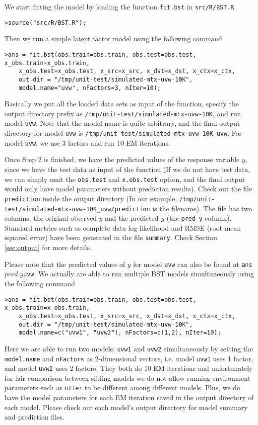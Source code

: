 We start fitting the model by loading the function {\tt fit.bst} in {\tt src/R/BST.R}. 
{\small\begin{verbatim}
>source("src/R/BST.R");
\end{verbatim}}
Then we run a simple latent factor model using the following command
{\small\begin{verbatim}
>ans = fit.bst(obs.train=obs.train, obs.test=obs.test, x_obs.train=x_obs.train, 
	x_obs.test=x_obs.test, x_src=x_src, x_dst=x_dst, x_ctx=x_ctx,
	out.dir = "/tmp/unit-test/simulated-mtx-uvw-10K", 
	model.name="uvw", nFactors=3, nIter=10);
\end{verbatim}}
Basically we put all the loaded data sets as input of the function, specify the output directory prefix as {\tt /tmp/unit-test/simulated-mtx-uvw-10K}, and run model {\tt uvw}. Note that the model name is quite arbitrary, and the final output directory for model {\tt uvw} is {\tt /tmp/unit-test/simulated-mtx-uvw-10K\_uvw}. For model {\tt uvw}, we use 3 factors and run 10 EM iterations. 

Once Step 2 is finished, we have the predicted values of the response variable $y$, since we have the test data as input of the function (If we do not have test data, we can simply omit the {\tt obs.test} and {\tt x.obs.test} option, and the final output would only have model parameters without prediction results).  Check out the file {\tt prediction} inside the output directory (In our example, {\tt /tmp/unit-test/simulated-mtx-uvw-10K\_uvw/prediction} is the filename). The file has two columns: the original observed $y$ and the predicted $y$ (the {\tt pred\_y} column). Standard metrics such as complete data log-likelihood and RMSE (root mean squared error) have been generated in the file {\tt summary}. Check Section \ref{sec:output} for more details.

Please note that the predicted values of $y$ for model {\tt uvw} can also be found at {\tt ans$pred.y$uvw}.
We actually are able to run multiple BST models simultaneously using the following command
{\small\begin{verbatim}
>ans = fit.bst(obs.train=obs.train, obs.test=obs.test, x_obs.train=x_obs.train, 
	x_obs.test=x_obs.test, x_src=x_src, x_dst=x_dst, x_ctx=x_ctx,
	out.dir = "/tmp/unit-test/simulated-mtx-uvw-10K", 
	model.name=c("uvw1", "uvw2"), nFactors=c(1,2), nIter=10);
\end{verbatim}}
Here we are able to run two models: {\tt uvw1} and {\tt uvw2} simultaneously by setting the {\tt model.name} and {\tt nFactors} as  2-dimensional vectors, i.e. model {\tt uvw1} uses 1 factor, and model {\tt uvw2} uses 2 factors. They both do 10 EM iterations and unfortunately for fair comparison between sibling models we do not allow running environment parameters such as {\tt nIter} to be different among different models. Plus, we do have the model parameters for each EM iteration saved in the output directory of each model. Please check out each model's output directory for model summary and prediction files.

